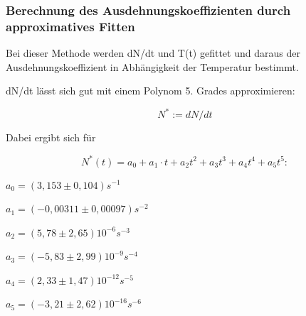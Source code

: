 \subsubsection{Berechnung des Ausdehnungskoeffizienten durch approximatives Fitten}

Bei dieser Methode werden dN/dt und T(t) gefittet und daraus der Ausdehnungskoeffizient in Abhängigkeit der Temperatur bestimmt.

dN/dt lässt sich gut mit einem Polynom 5. Grades approximieren:

\begin{equation}
 N^{*} := dN/dt 
\end{equation}

Dabei ergibt sich für 


\begin{equation}
N^{*}(t)=a_{0}+a_{1} \cdot t+a_{2}t^{2}+a_{3}t^{3}+a_{4}t^{4}+a_{5}t^{5} :
\end{equation}

$
 a_{0} =(3,153 \pm 0,104) s^{-1} 
$

$
a_{1}=(-0,00311 \pm 0,00097)s^{-2}
$

$
a_{2}=(5,78 \pm 2,65)10^{-6}s^{-3}
$

$
a_{3}=(-5,83 \pm 2,99)10^{-9}s^{-4}
$

$
a_{4}=(2,33 \pm 1,47)10^{-12}s^{-5}
$

$
a_{5}=(-3,21 \pm 2,62)10^{-16}s^{-6} 
$\\

